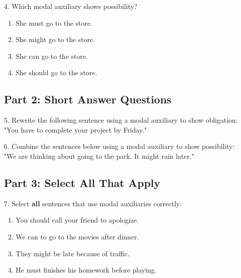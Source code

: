\documentclass[12pt]{article}
\begin{document}
\vspace{1cm}
\newpage

4. Which modal auxiliary shows possibility?\\
\begin{enumerate}[label=\Alph*.]
    \item She must go to the store.  
    \item She might go to the store.  
    \item She can go to the store.  
    \item She should go to the store.  
\end{enumerate}

\vspace{1cm}


\subsection*{Part 2: Short Answer Questions}

5. Rewrite the following sentence using a modal auxiliary to show obligation: \\
"You have to complete your project by Friday."\\
\vspace{3cm}

6. Combine the sentences below using a modal auxiliary to show possibility: \\
"We are thinking about going to the park. It might rain later."\\
\vspace{3cm}

\subsection*{Part 3: Select All That Apply}

7. Select \textbf{all} sentences that use modal auxiliaries correctly:\\
\begin{enumerate}[label=\Alph*.]
    \item You should call your friend to apologize.  
    \item We can to go to the movies after dinner.  
    \item They might be late because of traffic.  
    \item He must finishes his homework before playing.  
\end{enumerate}

\vspace{1cm}
\end{document}
